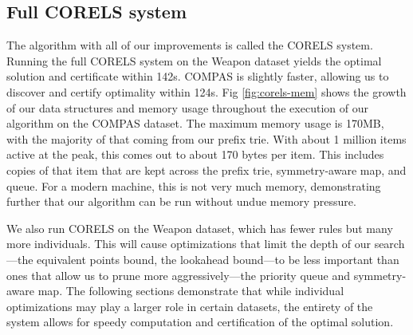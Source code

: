 \subsection{Full CORELS system}
The algorithm with all of our improvements is called the CORELS system.
Running the full CORELS system on the Weapon dataset yields the optimal solution and certificate within 142s.
COMPAS is slightly faster, allowing us to discover and certify optimality within 124s.
Fig \ref{fig:corels-mem} shows the growth of our data structures and memory usage throughout the execution of our algorithm on the COMPAS dataset.
The maximum memory usage is 170MB, with the majority of that coming from our prefix trie.
With about 1 million items active at the peak, this comes out to about 170 bytes per item.
This includes copies of that item that are kept across the prefix trie, symmetry-aware map, and queue.
For a modern machine, this is not very much memory, demonstrating further that our algorithm can be run without undue memory pressure.

We also run CORELS on the Weapon dataset, which has fewer rules but many more individuals.
This will cause optimizations that limit the depth of our search---the equivalent points bound, the lookahead bound---to be less important than ones that allow us to prune more aggressively---the priority queue and symmetry-aware map.
The following sections demonstrate that while individual optimizations may play a larger role in certain datasets, the entirety of the system allows for speedy computation and certification of the optimal solution.

